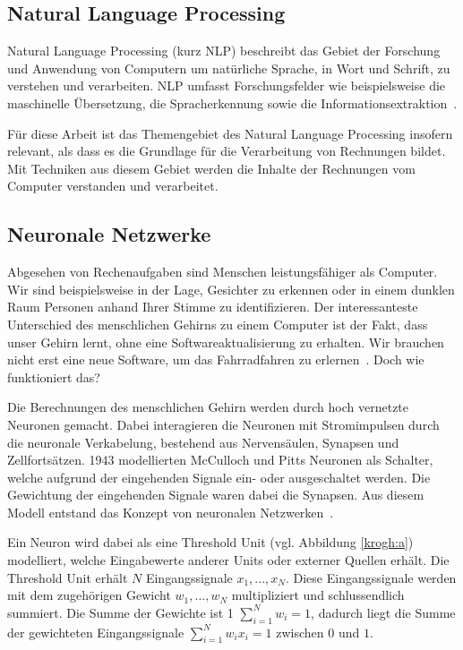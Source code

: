 \subsection{Natural Language Processing}

Natural Language Processing (kurz NLP) beschreibt das Gebiet der Forschung und Anwendung von Computern um natürliche Sprache, in Wort und Schrift, zu verstehen und verarbeiten. NLP umfasst Forschungsfelder wie beispielsweise die maschinelle Übersetzung, die Spracherkennung sowie die Informationsextraktion~\autocite{Chowdhury2003}. 

Für diese Arbeit ist das Themengebiet des Natural Language Processing insofern relevant, als dass es die Grundlage für die Verarbeitung von Rechnungen bildet. Mit Techniken aus diesem Gebiet werden die Inhalte der Rechnungen vom Computer verstanden und verarbeitet.

\subsection{Neuronale Netzwerke}
\label{chap:neuron}

Abgesehen von Rechenaufgaben sind Menschen leistungsfähiger als Computer. Wir sind beispielsweise in der Lage, Gesichter zu erkennen oder in einem dunklen Raum Personen anhand Ihrer Stimme zu identifizieren. Der interessanteste Unterschied des menschlichen Gehirns zu einem Computer ist der Fakt, dass unser Gehirn lernt, ohne eine Softwareaktualisierung zu erhalten. Wir brauchen nicht erst eine neue Software, um das Fahrradfahren zu erlernen~\autocite{Krogh2008}. Doch wie funktioniert das?

Die Berechnungen des menschlichen Gehirn werden durch hoch vernetzte Neuronen gemacht. Dabei interagieren die Neuronen mit Stromimpulsen durch die neuronale Verkabelung, bestehend aus Nervensäulen, Synapsen und Zellfortsätzen. 1943 modellierten McCulloch und Pitts Neuronen als Schalter, welche aufgrund der eingehenden Signale ein- oder ausgeschaltet werden. Die Gewichtung der eingehenden Signale waren dabei die Synapsen. Aus diesem Modell entstand das Konzept von neuronalen Netzwerken~\autocite{Krogh2008}.

Ein Neuron wird dabei als eine Threshold Unit (vgl. Abbildung \ref{krogh:a}) modelliert, welche Eingabewerte anderer Units oder externer Quellen erhält. Die Threshold Unit erhält $N$ Eingangssignale $x_1, ..., x_N$. Diese Eingangssignale werden mit dem zugehörigen Gewicht $w_1, ..., w_N$ multipliziert und schlussendlich summiert. Die Summe der Gewichte ist 1 $\sum_{i=1}^{N} w_i = 1$, dadurch liegt die Summe der gewichteten Eingangssignale $\sum_{i=1}^{N} w_i x_i = 1$ zwischen $0$ und $1$. 

